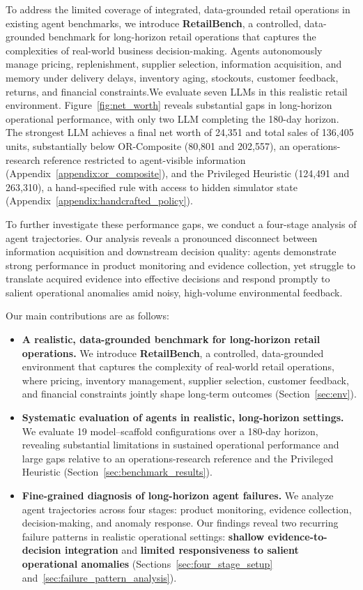 To address the limited coverage of integrated, data-grounded
retail operations in existing agent benchmarks, we introduce \textbf{RetailBench}, a controlled, data-grounded benchmark for long-horizon retail operations that captures the complexities of real-world business decision-making. Agents autonomously manage pricing, replenishment, supplier selection, information acquisition, and memory under delivery delays, inventory aging, stockouts, customer feedback, returns, and financial constraints.We evaluate seven LLMs in this realistic retail environment. Figure~\ref{fig:net_worth} reveals substantial gaps in long-horizon operational performance, with only two LLM completing the 180-day horizon. The strongest LLM achieves a final net worth of 24,351 and total sales of 136,405 units, substantially below OR-Composite (80,801 and 202,557), an operations-research reference restricted to agent-visible information (Appendix~\ref{appendix:or_composite}), and the Privileged Heuristic (124,491 and 263,310), a hand-specified rule with access to hidden simulator state (Appendix~\ref{appendix:handcrafted_policy}).

To further investigate these performance gaps, we conduct a four-stage analysis of agent trajectories. Our analysis reveals a pronounced disconnect between information acquisition and downstream decision quality: agents demonstrate strong performance in product monitoring and evidence collection, yet struggle to translate acquired evidence into effective decisions and respond promptly to salient operational anomalies amid noisy, high-volume environmental feedback.

Our main contributions are as follows:

\begin{itemize}[leftmargin=*]
    \item \textbf{A realistic, data-grounded benchmark for long-horizon retail operations.}
    We introduce \textbf{RetailBench}, a controlled, data-grounded environment that captures the complexity of real-world retail operations, where pricing, inventory management, supplier selection, customer feedback, and financial constraints jointly shape long-term outcomes (Section~\ref{sec:env}).

    \item \textbf{Systematic evaluation of agents in realistic, long-horizon settings.}
    We evaluate 19 model--scaffold configurations over a 180-day horizon, revealing substantial limitations in sustained operational performance and large gaps relative to an operations-research reference and the Privileged Heuristic (Section~\ref{sec:benchmark_results}).

    \item \textbf{Fine-grained diagnosis of long-horizon agent failures.}
    We analyze agent trajectories across four stages: product monitoring, evidence collection, decision-making, and anomaly response. Our findings reveal two recurring failure patterns in realistic operational settings: \textbf{shallow evidence-to-decision integration} and \textbf{limited responsiveness to salient operational anomalies} (Sections~\ref{sec:four_stage_setup} and~\ref{sec:failure_pattern_analysis}).
\end{itemize}